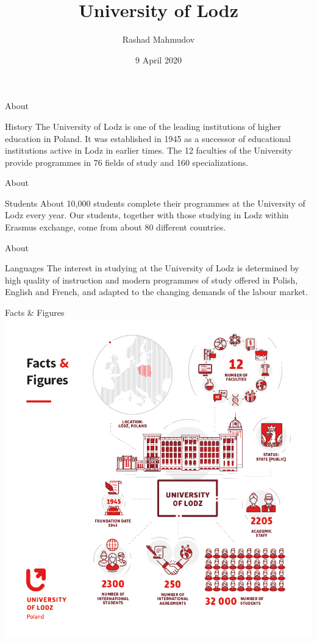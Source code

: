 \documentclass[hyperref={pdfpagemode=FullScreen}]{beamer}
\title{University of Lodz}
\author{Rashad Mahmudov}
\date{9 April 2020}
\begin{document}
\begin{frame}
\titlepage
\end{frame}

\begin{frame}{About}
\begin{block}{History}
  The University of Lodz is one of the leading institutions of higher education in Poland. 
  It was established in 1945 as a successor of educational institutions active in Lodz in earlier times. 
  The 12 faculties of the University provide programmes in 76 fields of study and 160 specializations.
\end{block}
\end{frame}

\begin{frame}{About}
\begin{block}{Students}
About 10,000 students complete their programmes at the University of Lodz every year. Our students, together with those studying in Lodz within Erasmus exchange, come from about 80 different countries.
\end{block}
\end{frame}

\begin{frame}{About}
\begin{block}{Languages}
The interest in studying at the University of Lodz is determined by high quality of instruction and modern programmes of study offered in Polish, English and French, and adapted to the changing demands of the labour market. 
\end{block}
\end{frame}

\begin{frame}{Facts \& Figures}
\centering\includegraphics[scale=0.35]{img/pic1.png}\qquad
\end{frame}
\end{document}

